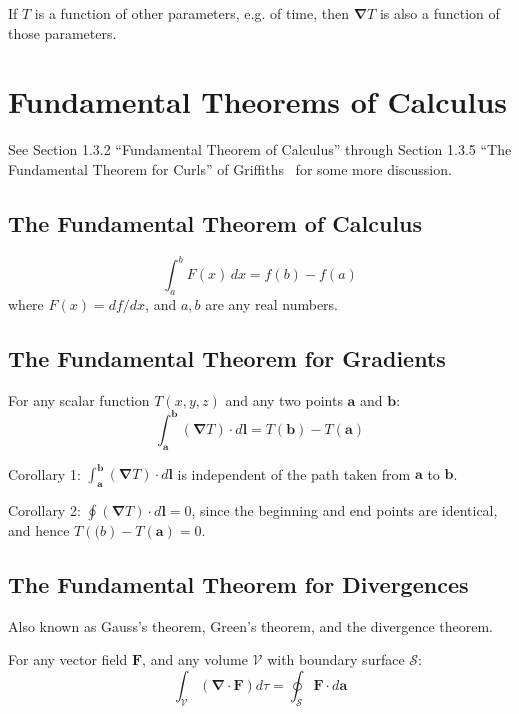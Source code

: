 \documentclass[a4paper]{article}
\theoremstyle{plain}
\theoremstyle{definition}
\newcommand{\vect}[1]{\textbf{#1}}
\newcommand{\del}{\bm{\nabla}}
\begin{document}
If $T$ is a function of other parameters, e.g. of time, then $\del T$
is also a function of those parameters.


\section{Fundamental Theorems of Calculus}

See Section 1.3.2 ``Fundamental Theorem of Calculus'' through Section
1.3.5 ``The Fundamental Theorem for Curls'' of
Griffiths~\cite{Griffiths1998} for some more discussion.

\subsection{The Fundamental Theorem of Calculus}

\begin{equation}
\int_{a}^{b} F(x) \,dx = f(b) - f(a)
\end{equation}
where $F(x) = df/dx$, and $a,b$ are any real numbers.

\subsection{The Fundamental Theorem for Gradients}
\label{sec:ftocgrad}

For any scalar function $T(x,y,z)$ and any two points $\vect{a}$ and
$\vect{b}$:
\begin{equation}
\int_{\vect{a}}^{\vect{b}} (\del T) \cdot d\vect{l} = T(\vect{b}) - T(\vect{a})
\end{equation}

Corollary 1: $\int_{\vect{a}}^{\vect{b}} (\del T) \cdot d\vect{l}$ is
independent of the path taken from $\vect{a}$ to $\vect{b}$.

Corollary 2: $\oint (\del T) \cdot d\vect{l} = 0$, since the beginning
and end points are identical, and hence $T(\vect(b) - T(\vect{a}) =
0$.

\subsection{The Fundamental Theorem for Divergences}
\label{sec:gaussthm}

Also known as Gauss's theorem, Green's theorem, and the divergence
theorem.

For any vector field $\vect{F}$, and any volume $\mathcal{V}$ with
boundary surface $\mathcal{S}$:
\begin{equation}
\int_{\mathcal{V}} (\del \cdot \vect{F}) d\tau = \oint_{\mathcal{S}} \vect{F} \cdot d\vect{a}
\end{equation}
\end{document}
